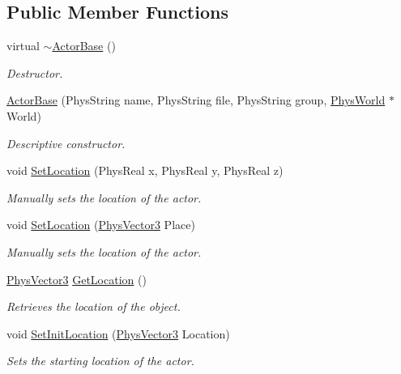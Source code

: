 \subsection*{Public Member Functions}
\begin{DoxyCompactItemize}
\item 
virtual \hyperlink{classActorBase_a6fd984c46b3232c2522adb44be4dedb7}{$\sim$ActorBase} ()
\begin{DoxyCompactList}\small\item\em Destructor. \item\end{DoxyCompactList}\item 
\hyperlink{classActorBase_a673d963aa7a99475cb03250c010dfa15}{ActorBase} (PhysString name, PhysString file, PhysString group, \hyperlink{classPhysWorld}{PhysWorld} $\ast$World)
\begin{DoxyCompactList}\small\item\em Descriptive constructor. \item\end{DoxyCompactList}\item 
void \hyperlink{classActorBase_a34848d620c5d9d2796999edbdcb77c9a}{SetLocation} (PhysReal x, PhysReal y, PhysReal z)
\begin{DoxyCompactList}\small\item\em Manually sets the location of the actor. \item\end{DoxyCompactList}\item 
void \hyperlink{classActorBase_a2a204add0b036de441ebd59d14939000}{SetLocation} (\hyperlink{classPhysVector3}{PhysVector3} Place)
\begin{DoxyCompactList}\small\item\em Manually sets the location of the actor. \item\end{DoxyCompactList}\item 
\hyperlink{classPhysVector3}{PhysVector3} \hyperlink{classActorBase_a9dfdaf0304e4a462b3b033fb254116af}{GetLocation} ()
\begin{DoxyCompactList}\small\item\em Retrieves the location of the object. \item\end{DoxyCompactList}\item 
void \hyperlink{classActorBase_ac118fc21f89d067d987d511b444f7d55}{SetInitLocation} (\hyperlink{classPhysVector3}{PhysVector3} Location)
\begin{DoxyCompactList}\small\item\em Sets the starting location of the actor. \item\end{DoxyCompactList}\item 

\end{DoxyCompactItemize}
